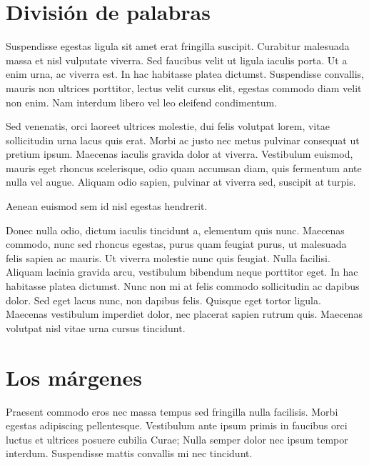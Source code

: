 \documentclass[12pt,a4paper]{report}
\begin{document}
\section{División de palabras}
\label{seccion.division}



Suspendisse egestas ligula sit amet erat fringilla suscipit. Curabitur malesuada massa et nisl vulputate viverra. Sed faucibus velit ut ligula iaculis porta. Ut a enim urna, ac viverra est. In hac habitasse platea dictumst. Suspendisse convallis, mauris non ultrices porttitor, lectus velit cursus elit, egestas commodo diam velit non enim. Nam interdum libero vel leo eleifend condimentum. 

Sed venenatis, orci laoreet ultrices molestie, dui felis volutpat lorem, vitae sollicitudin urna lacus quis erat. Morbi ac justo nec metus pulvinar consequat ut pretium ipsum. Maecenas iaculis gravida dolor at viverra. Vestibulum euismod, mauris eget rhoncus scelerisque, odio quam accumsan diam, quis fermentum ante nulla vel augue. Aliquam odio sapien, pulvinar at viverra sed, suscipit at turpis. 

Aenean euismod sem id nisl egestas hendrerit.

Donec nulla odio, dictum iaculis tincidunt a, elementum quis nunc. Maecenas commodo, nunc sed rhoncus egestas, purus quam feugiat purus, ut malesuada felis sapien ac mauris. Ut viverra molestie nunc quis feugiat. Nulla facilisi. Aliquam lacinia gravida arcu, vestibulum bibendum neque porttitor eget. In hac habitasse platea dictumst. Nunc non mi at felis commodo sollicitudin ac dapibus dolor. Sed eget lacus nunc, non dapibus felis. Quisque eget tortor ligula. Maecenas vestibulum imperdiet dolor, nec placerat sapien rutrum quis. Maecenas volutpat nisl vitae urna cursus tincidunt. 





\section{Los márgenes}
\label{seccion.margenes}



Praesent commodo eros nec massa tempus sed fringilla nulla facilisis. Morbi egestas adipiscing pellentesque. Vestibulum ante ipsum primis in faucibus orci luctus et ultrices posuere cubilia Curae; Nulla semper dolor nec ipsum tempor interdum. Suspendisse mattis convallis mi nec tincidunt. 
\end{document}
